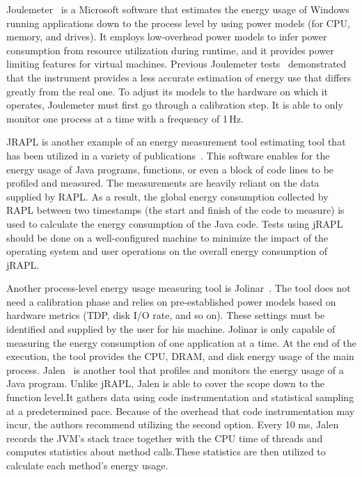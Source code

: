 Joulemeter~\cite{kothari2009joulemeter,jagroep2017energy} is a Microsoft software that estimates the energy usage of Windows running applications down to the process level by using power models (for CPU, memory, and drives).
It employs low-overhead power models to infer power consumption from resource utilization during runtime, and it provides power limiting features for virtual machines.
Previous Joulemeter tests~\cite{jagroep2015profiling} demonstrated that the instrument provides a less accurate estimation of energy use that differs greatly from the real one.
To adjust its models to the hardware on which it operates, Joulemeter must first go through a calibration step.
It is able to only monitor one process at a time with a frequency of 1\,Hz.

JRAPL is another example of an energy measurement tool estimating tool that has been utilized in a variety of publications~\cite{guimaraes2016some,liu2015data}.
This software enables for the energy usage of Java programs, functions, or even a block of code lines to be profiled and measured.
The measurements are heavily reliant on the data supplied by RAPL.
As a result, the global energy consumption collected by RAPL between two timestamps (the start and finish of the code to measure) is used to calculate the energy consumption of the Java code.
Tests using jRAPL should be done on a well-configured machine to minimize the impact of the operating system and user operations on the overall energy consumption of jRAPL.

Another process-level energy usage measuring tool is Jolinar~\cite{islam2016measuring,noureddine2016jolinar}.
The tool does not need a calibration phase and relies on pre-established power models based on hardware metrics (TDP, disk I/O rate, and so on).
These settings must be identified and supplied by the user for his machine.
Jolinar is only capable of measuring the energy consumption of one application at a time.
At the end of the execution, the tool provides the CPU, DRAM, and disk energy usage of the main process.
Jalen~\cite{noureddine2015monitoring} is another tool that profiles and monitors the energy usage of a Java program.
Unlike jRAPL, Jalen is able to cover the scope down to the function level.It gathers data using code instrumentation and statistical sampling at a predetermined pace.
Because of the overhead that code instrumentation may incur, the authors recommend utilizing the second option.
Every 10 ms, Jalen records the JVM's stack trace together with the CPU time of threads and computes statistics about method calls.These statistics are then utilized to calculate each method's energy usage.

